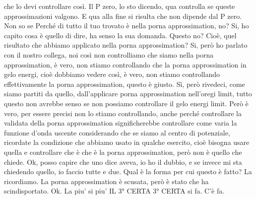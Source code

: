 \begin{soluzione}
{che lo devi controllare così. Il P zero, lo sto dicendo, qua controlla se queste approssimazioni valgono. E qua alla fine si risulta che non dipende dal P zero. Non so se Perché di tutto il tuo trovato è nella porna approssimation, no? Si, ho capito cosa è quello di dire, ha senso la sua domanda. Questo no? Cioè, quel risultato che abbiamo applicato nella porna approssimation? Si, però ho parlato con il nostro collega, noi così non controlliamo che siamo nella porna approssimation, è vero, non stiamo controllando che la porna approssimation in gelo energi, cioè dobbiamo vedere così, è vero, non stiamo controllando effettivamente la porna approssimation, questo è giusto. Sì, però rivedeci, come siamo partiti da quello, dall'applicare porna approssimation nell'oregi limit, tutto questo non avrebbe senso se non possiamo controllare il gelo energi limit. Però è vero, per essere precisi non lo stiamo controllando, anche perché controllare la validata della porna approssimation significherebbe controllare come varia la funzione d'onda uscente considerando che se siamo al centro di potenziale, ricordate la condizione che abbiamo usato in qualche esercito, cioè bisogna usare quella e controllare che è che è la porna approssimation, però non è quello che chiede. Ok, posso capire che uno dice aveva, io ho il dubbio, e se invece mi sta chiedendo quello, io faccio tutte e due. Qual è la forma per cui questo è fatto? La ricordiamo. La porna approssimation è scusata, però è stato che ha scindisportato. Ok. La piu' si piu' IL 3° CERTA 3° CERTA si fa. C'è fa. 
   
}
\end{soluzione}
